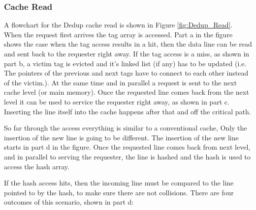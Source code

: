 \subsubsection{Cache Read}
A flowchart for the Dedup cache read is shown in Figure \ref{fig:Dedup_Read}. When the request first arrives the tag array is accessed. Part a in the figure shows the case when the tag access results in a hit, then the data line can be read and sent back to the requester right away. If the tag access is a miss, as shown in part b, a victim tag is evicted and it's linked list (if any) has to be updated (i.e. The pointers of the previous and next tags have to connect to each other instead of the victim.). At the same time and in parallel a request is sent to the next cache level (or main memory). Once the requested line comes back from the next level it can be used to service the requester right away, as shown in part c. Inserting the line itself into the cache happens after that and off the critical path.\par
So far through the access everything is similar to a conventional cache, Only the insertion of the new line is going to be different. The insertion of the new line starts in part d in the figure. Once the requested line comes back from next level, and in parallel to serving the requester, the line is hashed and the hash is used to access the hash array.\par
If the hash access hits, then the incoming line must be compared to the line pointed to by the hash, to make sure there are not collisions. There are four outcomes of this scenario, shown in part d:

